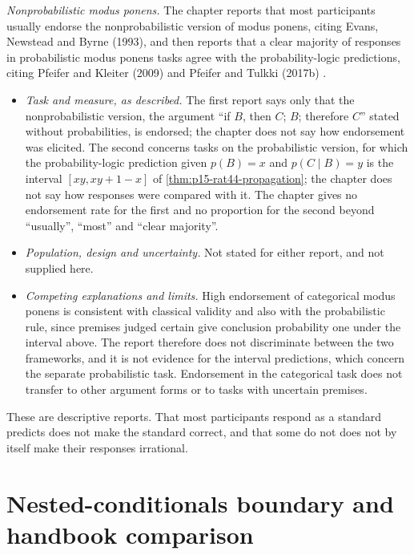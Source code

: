 \emph{Nonprobabilistic modus ponens.} The chapter reports that most
participants usually endorse the nonprobabilistic version of modus
ponens, citing Evans, Newstead and Byrne (1993), and then reports that
a clear majority of responses in probabilistic modus ponens tasks agree
with the probability-logic predictions, citing Pfeifer and Kleiter (2009)
and Pfeifer and Tulkki (2017b) \cite[p.~281]{Pfeifer2021ProbabilityLogic}.
\begin{itemize}
\item \emph{Task and measure, as described.} The first report says
      only that the nonprobabilistic version, the argument
      ``if \(B\), then \(C\); \(B\); therefore \(C\)'' stated without
      probabilities, is endorsed; the chapter does not say how
      endorsement was elicited. The second concerns tasks on the
      probabilistic version, for which the probability-logic prediction
      given \(p(B)=x\) and \(p(C\mid B)=y\) is the interval
      \([xy,xy+1-x]\) of \cref{thm:p15-rat44-propagation}; the chapter
      does not say how responses were compared with it.
      The chapter gives no endorsement rate for the first and no
      proportion for the second beyond ``usually'', ``most'' and
      ``clear majority''.
\item \emph{Population, design and uncertainty.} Not stated for either
      report, and not supplied here.
\item \emph{Competing explanations and limits.} High endorsement of
      categorical modus ponens is consistent with classical validity and
      also with the probabilistic rule, since premises judged certain
      give conclusion probability one under the interval above. The
      report therefore does not discriminate between the two frameworks,
      and it is not evidence for the interval predictions, which concern
      the separate probabilistic task. Endorsement in the categorical
      task does not transfer to other argument forms or to tasks with
      uncertain premises.
\end{itemize}
These are descriptive reports. That most participants respond as a
standard predicts does not make the standard correct, and that some do
not does not by itself make their responses irrational.

\section{Nested-conditionals boundary and handbook comparison}


